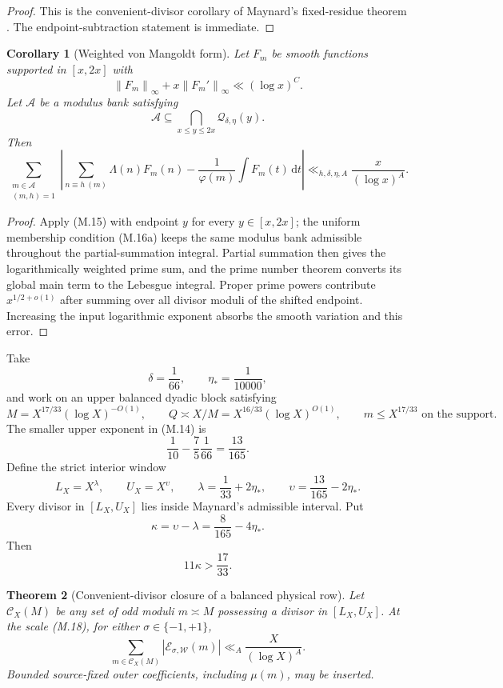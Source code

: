 \documentclass[11pt]{article}
\newtheorem{theorem}{Theorem}[section]
\newtheorem{corollary}[theorem]{Corollary}
\theoremstyle{definition}
\theoremstyle{remark}
\newcommand{\dd}{\mathrm d}
\newcommand{\norm}[1]{\left\lVert#1\right\rVert}
\newcommand{\abs}[1]{\left\lvert#1\right\rvert}
\begin{document}
\begin{proof}
This is the convenient-divisor corollary of Maynard's fixed-residue theorem
\cite{MaynardFixed}.  The endpoint-subtraction statement is immediate.
\end{proof}

\begin{corollary}[Weighted von Mangoldt form]
\label{cor:hard-Maynard-Lambda}
Let $F_m$ be smooth functions supported in $[x,2x]$ with
\[
 \norm{F_m}_\infty+x\norm{F_m'}_\infty\ll(\log x)^C.
\]
Let $\mathscr A$ be a modulus bank satisfying
\[
 \mathscr A\subseteq
 \bigcap_{x\le y\le2x}\mathscr Q_{\delta,\eta}(y).
 \tag{M.16a}
\]
Then
\[
 \boxed{
 \sum_{\substack{m\in\mathscr A\\(m,h)=1}}
 \left|
  \sum_{n\equiv h\ (m)}\Lambda(n)F_m(n)
  -\frac1{\varphi(m)}\int F_m(t)\,\dd t
 \right|
 \ll_{h,\delta,\eta,A}\frac{x}{(\log x)^A}.}
 \tag{M.16}
\]
\end{corollary}

\begin{proof}
Apply \textup{(M.15)} with endpoint $y$ for every $y\in[x,2x]$; the
uniform membership condition \textup{(M.16a)} keeps the same modulus bank
admissible throughout the partial-summation integral.  Partial summation
then gives the logarithmically weighted prime sum, and the prime number
theorem converts its global main term to the Lebesgue integral.  Proper
prime powers contribute $x^{1/2+o(1)}$ after summing over all divisor moduli
of the shifted endpoint.  Increasing the input logarithmic exponent absorbs
the smooth variation and this error.
\end{proof}

Take
\[
 \delta=\frac1{66},
 \qquad
 \eta_*=\frac1{10000},
 \tag{M.17}
\]
and work on an upper balanced dyadic block satisfying
\[
 M=X^{17/33}(\log X)^{-O(1)},
 \qquad
 Q\asymp X/M=X^{16/33}(\log X)^{O(1)},
 \qquad
 m\le X^{17/33}\text{ on the support}.
 \tag{M.18}
\]
The smaller upper exponent in \textup{(M.14)} is
\[
 \frac1{10}-\frac7{5}\frac1{66}=\frac{13}{165}.
\]
Define the strict interior window
\[
 \boxed{
 L_X=X^\lambda,
 \qquad U_X=X^\upsilon,
 \qquad
 \lambda=\frac1{33}+2\eta_*,
 \qquad
 \upsilon=\frac{13}{165}-2\eta_*.}
 \tag{M.19}
\]
Every divisor in $[L_X,U_X]$ lies inside Maynard's admissible interval.  Put
\[
 \boxed{
 \kappa=\upsilon-\lambda
 =\frac8{165}-4\eta_*.}
 \tag{M.20}
\]
Then
\[
 11\kappa>\frac{17}{33}.
 \tag{M.21}
\]

\begin{theorem}[Convenient-divisor closure of a balanced physical row]
\label{thm:hard-convenient-row}
Let $\mathscr C_X(M)$ be any set of odd moduli $m\asymp M$ possessing a
divisor in $[L_X,U_X]$.  At the scale \textup{(M.18)}, for either
$\sigma\in\{-1,+1\}$,
\[
 \boxed{
 \sum_{m\in\mathscr C_X(M)}
 \abs{\mathcal E_{\sigma,\mathscr W}(m)}
 \ll_A\frac{X}{(\log X)^A}.}
 \tag{M.22}
\]
Bounded source-fixed outer coefficients, including $\mu(m)$, may be inserted.
\end{theorem}
\end{document}
